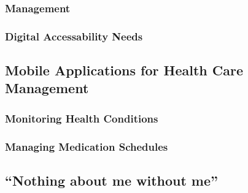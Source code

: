 \documentclass[../main.tex]{subfiles}
\begin{document}
\subsubsection{Management}
\subsubsection{Digital Accessability Needs}
\subsection{Mobile Applications for Health Care Management}
\subsubsection{Monitoring Health Conditions}
\subsubsection{Managing Medication Schedules}
\subsection{\enquote{Nothing about me without me}}
\clearpage
\end{document}
